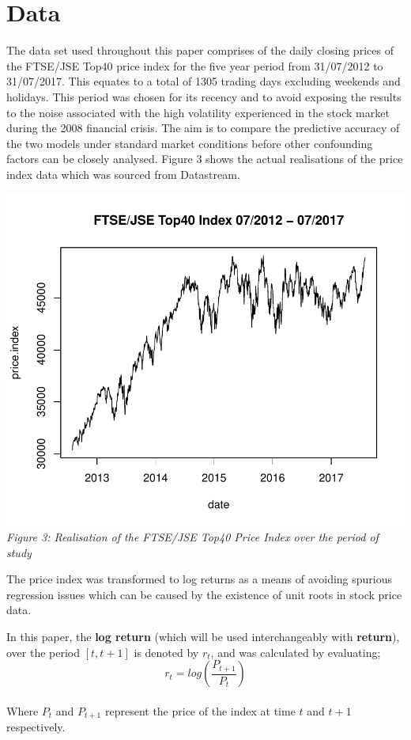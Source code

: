 \documentclass[12pt,a4paper]{article}
\numberwithin{equation}{section}
\numberwithin{figure}{section}
\numberwithin{table}{section}
\begin{document}
\section{Data}\label{data}

The data set used throughout this paper comprises of the daily closing
prices of the FTSE/JSE Top40 price index for the five year period from
31/07/2012 to 31/07/2017. This equates to a total of 1305 trading days
excluding weekends and holidays. This period was chosen for its recency
and to avoid exposing the results to the noise associated with the high
volatility experienced in the stock market during the 2008 financial
crisis. The aim is to compare the predictive accuracy of the two models
under standard market conditions before other confounding factors can be
closely analysed. Figure 3 shows the actual realisations of the price
index data which was sourced from Datastream.

\includegraphics{Draft_Paper_files/figure-latex/unnamed-chunk-1-1.pdf}
\emph{Figure 3: Realisation of the FTSE/JSE Top40 Price Index over the
period of study}

The price index was transformed to log returns as a means of avoiding
spurious regression issues which can be caused by the existence of unit
roots in stock price data.

In this paper, the \textbf{log return} (which will be used
interchangeably with \textbf{return}), over the period \([t,t+1]\) is
denoted by \(r_t\), and was calculated by evaluating;\\
\[
r_t = log(\frac{P_{t+1}}{P_t})  \label{eq1}
\]\\
Where \(P_t\) and \(P_{t+1}\) represent the price of the index at time
\(t\) and \(t+1\) respectively.
\end{document}
